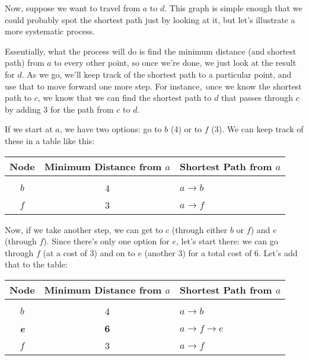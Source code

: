 Now, suppose we want to travel from $a$ to $d$.  This graph is simple enough that we could probably spot the shortest path just by looking at it, but let's illustrate a more systematic process.

Essentially, what the process will do is find the minimum distance (and shortest path) from $a$ to every other point, so once we're done, we just look at the result for $d$.  As we go, we'll keep track of the shortest path to a particular point, and use that to move forward one more step.  For instance,\shortestpathexa\ once we know the shortest path to $c$, we know that we can find the shortest path to $d$ that passes through $c$ by adding 3 for the path from $c$ to $d$.

If we start at $a$, we have two options: go to $b$ (4) or to $f$ (3).  We can keep track of these in a table like this:
\begin{center}
\begin{tabular}{c c l}
\textbf{Node} & \textbf{Minimum Distance from $a$} & \textbf{Shortest Path from $a$}\\
\hline
& & \\
$b$ & 4 & $a \to b$\\
$f$ & 3 & $a \to f$
\end{tabular}
\end{center}

Now, if we take another step, we can get to $c$ (through either $b$ or $f$) and $e$ (through $f$).  Since there's only one option for $e$, let's start there: we can go through $f$ (at a cost of 3) and on to $e$ (another 3) for a total cost of $6$.  Let's add that to the table:\shortestpathexb
\begin{center}
\begin{tabular}{c c l}
\textbf{Node} & \textbf{Minimum Distance from $a$} & \textbf{Shortest Path from $a$}\\
\hline
& & \\
$b$ & 4 & $a \to b$\\
{\LARGE\bfseries\color{red} \emph{e}} & {\Large\bfseries\color{red} 6} & {\LARGE\bfseries\color{red} $a \to f \to e$}\\
$f$ & 3 & $a \to f$
\end{tabular}
\end{center}


